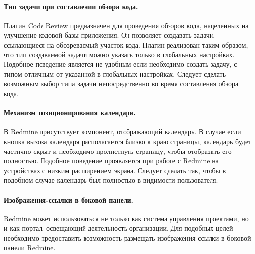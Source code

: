 \paragraph{Тип задачи при составлении обзора кода.}
Плагин Code Review предназначен для проведения обзоров кода, нацеленных на
улучшение кодовой базы приложения. Он позволяет создавать задачи, ссылающиеся
на обозреваемый участок кода. Плагин реализован таким образом, что тип
создаваемой задачи можно указать только в глобальных настройках. Подобное
поведение является не удобным если необходимо создать задачу, с типом отличным
от указанной в глобальных настройках. Следует сделать возможным выбор типа
задачи непосредственно во время составления обзора кода.

\paragraph{Механизм позиционирования календаря.}
В Redmine присутствует компонент, отображающий календарь. В случае если кнопка
вызова календаря располагается близко к краю страницы, календарь
будет частично скрыт и необходимо пролистнуть страницу, чтобы отобразить его
полностью. Подобное поведение проявляется при работе с Redmine на устройствах с
низким расширением экрана. Следует сделать так, чтобы в подобном случае
календарь был полностью в видимости пользователя.

\paragraph{Изображения-ссылки в боковой панели.}
Redmine может использоваться не только как система управления проектами, но и
как портал, освещающий деятельность организации. Для подобных целей необходимо
предоставить возможность размещать изображения-ссылки в боковой панели Redmine.



